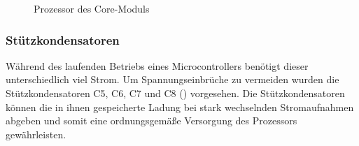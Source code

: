 \begin{figure}[H]
    \centering
    \qquad
    \qquad
    \caption[Prozessor des Core-Moduls]{Prozessor des \gls{Core-Modul}s}
    \label{fig:coremodul-prozessor}
\end{figure}

\subsubsection{Stützkondensatoren}
Während des laufenden Betriebs eines Microcontrollers benötigt dieser unterschiedlich viel Strom. Um Spannungseinbrüche zu vermeiden wurden die Stützkondensatoren C5, C6, C7 und C8 () vorgesehen. Die Stützkondensatoren können die in ihnen gespeicherte Ladung bei stark wechselnden Stromaufnahmen abgeben und somit eine ordnungsgemäße Versorgung des Prozessors gewährleisten.

